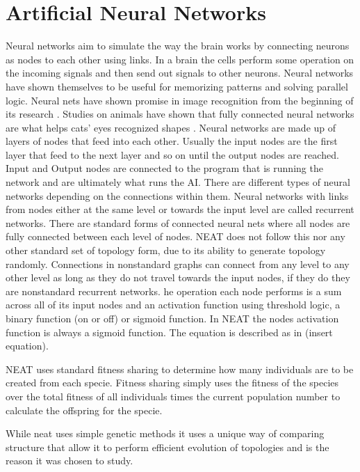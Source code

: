 \documentclass[12pt]{ucthesis} \newif\ifpdf \ifx\pdfoutput\undefined
\begin{document}
\section{Artiﬁcial Neural Networks}

Neural networks aim to simulate the way the brain works by connecting neurons as
nodes to each other using links. In a brain the cells perform some operation on
the incoming signals and then send out signals to other neurons.
Neural networks have shown themselves to be useful for memorizing patterns and
solving parallel logic. Neural nets have shown promise in image recognition from
the beginning of its research \cite{lippmann}. Studies on animals have shown
that fully connected neural networks are what helps cats’ eyes recognized shapes
\cite{hubel1959receptive}.
Neural networks are made up of layers of nodes that feed into each other.
Usually the input nodes are the first layer that feed to the next layer and so
on until the output nodes are reached. Input and Output nodes are connected to
the program that is running the network and are ultimately what runs the AI.
There are different types of neural networks depending on the connections within
them. Neural networks with links from nodes either at the same level or towards
the input level are called recurrent networks. There are standard forms of
connected neural nets where all nodes are fully connected between each level of
nodes. NEAT does not follow this nor any other standard set of topology form,
due to its ability to generate topology randomly. Connections in nonstandard
graphs can connect from any level to any other level as long as they do not
travel towards the input nodes, if they do they are nonstandard recurrent
networks.
he operation each node performs is a sum across all of its input nodes and an
activation function using threshold logic, a binary function (on or off) or
sigmoid function. In NEAT the nodes activation function is always a sigmoid
function. The equation is described as in (insert equation).

NEAT uses standard fitness sharing to determine how many individuals are to be
created from each specie. Fitness sharing simply uses the fitness of the species
over the total fitness of all individuals times the current population number to
calculate the offspring for the specie.

While neat uses simple genetic methods it uses a unique way of comparing
structure that allow it to perform efficient evolution of topologies and is the
reason it was chosen to study.
\end{document}

